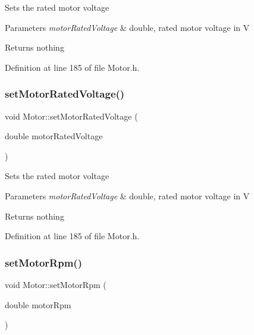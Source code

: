 Sets the rated motor voltage


\begin{DoxyParams}{Parameters}
{\em motor\+Rated\+Voltage} & double, rated motor voltage in V\\
\hline
\end{DoxyParams}
\begin{DoxyReturn}{Returns}
nothing 
\end{DoxyReturn}


Definition at line 185 of file Motor.\+h.

\mbox{\label{class_motor_aab754019236e34cba0acd3632567515e}} 
\subsubsection{\texorpdfstring{set\+Motor\+Rated\+Voltage()}{setMotorRatedVoltage()}\hspace{0.1cm}{\footnotesize\ttfamily [3/3]}}
{\footnotesize\ttfamily void Motor\+::set\+Motor\+Rated\+Voltage (\begin{DoxyParamCaption}\item[{double}]{motor\+Rated\+Voltage }\end{DoxyParamCaption})\hspace{0.3cm}{\ttfamily [inline]}}

Sets the rated motor voltage


\begin{DoxyParams}{Parameters}
{\em motor\+Rated\+Voltage} & double, rated motor voltage in V\\
\hline
\end{DoxyParams}
\begin{DoxyReturn}{Returns}
nothing 
\end{DoxyReturn}


Definition at line 185 of file Motor.\+h.

\mbox{\label{class_motor_ac0fda674bd40e24bb864e8256fb5ba32}} 
\subsubsection{\texorpdfstring{set\+Motor\+Rpm()}{setMotorRpm()}\hspace{0.1cm}{\footnotesize\ttfamily [1/3]}}
{\footnotesize\ttfamily void Motor\+::set\+Motor\+Rpm (\begin{DoxyParamCaption}\item[{double}]{motor\+Rpm }\end{DoxyParamCaption})\hspace{0.3cm}{\ttfamily [inline]}}

